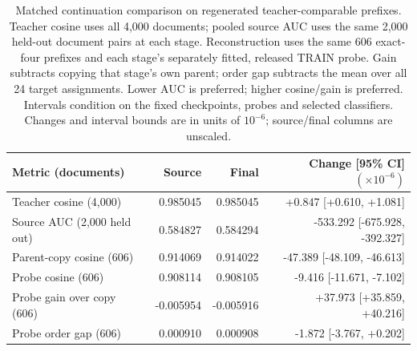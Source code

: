 \begin{table}[H]
\caption{Matched continuation comparison on regenerated teacher-comparable prefixes. Teacher cosine uses all 4,000 documents; pooled source AUC uses the same 2,000 held-out document pairs at each stage. Reconstruction uses the same 606 exact-four prefixes and each stage's separately fitted, released TRAIN probe. Gain subtracts copying that stage's own parent; order gap subtracts the mean over all 24 target assignments. Lower AUC is preferred; higher cosine/gain is preferred. Intervals condition on the fixed checkpoints, probes and selected classifiers. Changes and interval bounds are in units of $10^{-6}$; source/final columns are unscaled.}
\label{tab:continuation-comparison}
\centering\footnotesize
\begin{tabularx}{\linewidth}{Yrrr}
\toprule
Metric (documents) & Source & Final & Change [95\% CI] $(\times10^{-6})$ \\
\midrule
Teacher cosine (4,000) & 0.985045 & 0.985045 & +0.847 [+0.610, +1.081] \\
Source AUC (2,000 held out) & 0.584827 & 0.584294 & -533.292 [-675.928, -392.327] \\
Parent-copy cosine (606) & 0.914069 & 0.914022 & -47.389 [-48.109, -46.613] \\
Probe cosine (606) & 0.908114 & 0.908105 & -9.416 [-11.671, -7.102] \\
Probe gain over copy (606) & -0.005954 & -0.005916 & +37.973 [+35.859, +40.216] \\
Probe order gap (606) & 0.000910 & 0.000908 & -1.872 [-3.767, +0.202] \\
\bottomrule
\end{tabularx}
\end{table}
